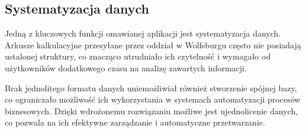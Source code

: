 \subsection{Systematyzacja danych}
Jedną z kluczowych funkcji omawianej aplikacji jest systematyzacja danych. Arkusze kalkulacyjne przesyłane przez oddział w Wolfsburgu często nie posiadają ustalonej struktury, co znacząco utrudniało ich czytelność i wymagało od użytkowników dodatkowego czasu na analizę zawartych informacji.

Brak jednolitego formatu danych uniemożliwiał również stworzenie spójnej bazy, co ograniczało możliwość ich wykorzystania w systemach automatyzacji procesów biznesowych. Dzięki wdrożonemu rozwiązaniu możliwe jest ujednolicenie danych, co pozwala na ich efektywne zarządzanie i automatyczne przetwarzanie.